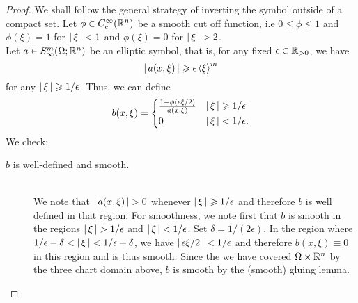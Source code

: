 \documentclass{article}
\begin{document}
\begin{proof}
    We shall follow the general strategy of inverting the symbol outside of a compact set. Let $\phi \in C^\infty_c(\R^n)$ be a smooth cut off function, i.e $0 \leq \phi \leq 1$ and $ \phi(\xi) = 1$ for $\abs{\xi} < 1$ and $\phi(\xi) = 0 $ for $\abs{\xi} > 2$. \\
    
    Let $a \in S^{m}_\infty(\Omega; \R^n)$ be an elliptic symbol, that is, for any fixed $\epsilon \in \R_{> 0}$, we have 
    \[
    \abs{a(x, \xi)} \geq \epsilon \sym[\xi]^m
    \]
    for any $\abs{\xi} \geq 1/\epsilon$. Thus, we can define 
    \begin{align*}
    b(x, \xi) = 
    \begin{cases}
    \frac{1 - \phi( \epsilon \xi /2)}{a(x, \xi)} & \abs{\xi} \geq 1/ \epsilon \\
    0 & \abs{\xi} < 1 / \epsilon. 
    \end{cases}
    \end{align*}
    We check: 
    \begin{description}
        \item[$b$ is well-defined and smooth. ] \hfill \\
        We note that $\abs{a(x, \xi)} > 0$ whenever $\abs{\xi} \geq 1/\epsilon$ and therefore $b$ is well defined in that region. For smoothness, we note first that $b$ is smooth in the regions $\abs{\xi} > 1/ \epsilon$ and $\abs{\xi} < 1/\epsilon$. Set $\delta = 1/(2 \epsilon)$. In the region where $1/\epsilon - \delta < \abs{\xi} < 1/\epsilon + \delta$, we have $\abs{\epsilon \xi/ 2} < 1/\epsilon$ and therefore $b(x, \xi) \equiv 0$ in this region and is thus smooth. Since the we have covered $\Omega \times \R^n$ by the three chart domain above, $b$ is smooth by the (smooth) gluing lemma. 
        

\end{description}
\end{proof}
\end{document}

